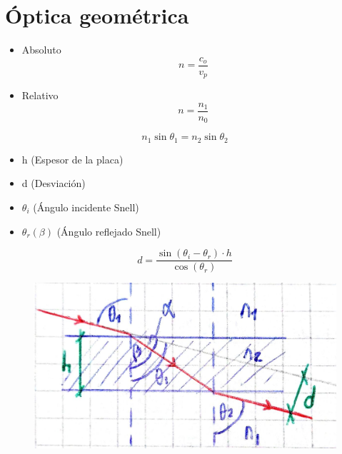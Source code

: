 \section{Óptica geométrica}
\begin{itemize}
    \item Absoluto
    \begin{equation}
        n = \frac{c_o}{v_p}
    \end{equation}
    \item Relativo
    \begin{equation}
        n = \frac{n_1}{n_0}
    \end{equation}
\end{itemize}

\begin{equation}
    n_1 \sin{\theta_1} = n_2 \sin{\theta_2}
\end{equation}

\begin{itemize}
    \item h (Espesor de la placa)
    \item d (Desviación)
    \item $\theta_i$ (Ángulo incidente Snell)
    \item $\theta_r (\beta)$ (Ángulo reflejado Snell)
\end{itemize}
\begin{equation}
    d = \frac{\sin{(\theta_i - \theta_r)} \cdot h}{\cos{(\theta_r)}}
\end{equation}
\begin{figure}[h]
    \centering
    \includegraphics[scale=0.12]{images/laminas_paralelas.png}
\end{figure}

